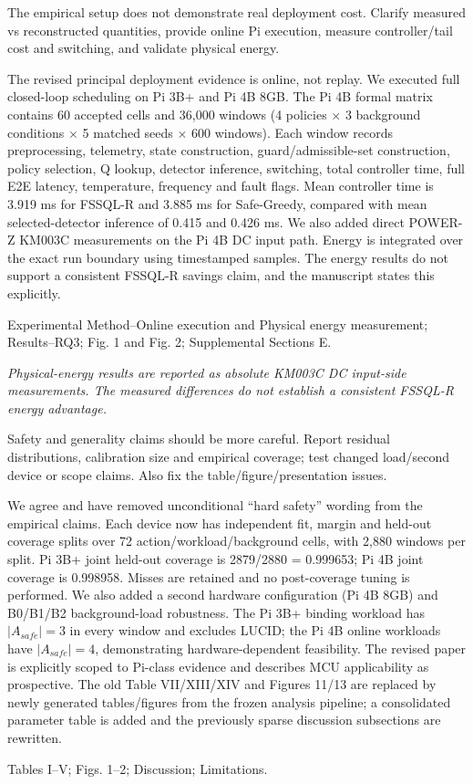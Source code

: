 \documentclass[11pt,a4paper]{article}
\newcommand{\commentbox}[1]{\begin{rcommentbox}#1\end{rcommentbox}}
\newcommand{\responsebox}[1]{\begin{authorresponsebox}#1\end{authorresponsebox}}
\newcommand{\changebox}[1]{\begin{wherebox}#1\end{wherebox}}
\begin{document}
\commentbox{The empirical setup does not demonstrate real deployment cost. Clarify measured vs reconstructed quantities, provide online Pi execution, measure controller/tail cost and switching, and validate physical energy.}
\responsebox{The revised principal deployment evidence is online, not replay. We executed full closed-loop scheduling on Pi 3B+ and Pi 4B 8GB. The Pi 4B formal matrix contains 60 accepted cells and 36,000 windows (4 policies $\times$ 3 background conditions $\times$ 5 matched seeds $\times$ 600 windows). Each window records preprocessing, telemetry, state construction, guard/admissible-set construction, policy selection, Q lookup, detector inference, switching, total controller time, full E2E latency, temperature, frequency and fault flags. Mean controller time is 3.919 ms for FSSQL-R and 3.885 ms for Safe-Greedy, compared with mean selected-detector inference of 0.415 and 0.426 ms. We also added direct POWER-Z KM003C measurements on the Pi 4B DC input path. Energy is integrated over the exact run boundary using timestamped samples. The energy results do not support a consistent FSSQL-R savings claim, and the manuscript states this explicitly.}
\changebox{Experimental Method--Online execution and Physical energy measurement; Results--RQ3; Fig. 1 and Fig. 2; Supplemental Sections E.}
\begin{excerptbox}
\emph{Physical-energy results are reported as absolute KM003C DC input-side measurements. The measured differences do not establish a consistent FSSQL-R energy advantage.}
\end{excerptbox}

\commentbox{Safety and generality claims should be more careful. Report residual distributions, calibration size and empirical coverage; test changed load/second device or scope claims. Also fix the table/figure/presentation issues.}
\responsebox{We agree and have removed unconditional ``hard safety'' wording from the empirical claims. Each device now has independent fit, margin and held-out coverage splits over 72 action/workload/background cells, with 2,880 windows per split. Pi 3B+ joint held-out coverage is 2879/2880 = 0.999653; Pi 4B joint coverage is 0.998958. Misses are retained and no post-coverage tuning is performed. We also added a second hardware configuration (Pi 4B 8GB) and B0/B1/B2 background-load robustness. The Pi 3B+ binding workload has $|A_{safe}|=3$ in every window and excludes LUCID; the Pi 4B online workloads have $|A_{safe}|=4$, demonstrating hardware-dependent feasibility. The revised paper is explicitly scoped to Pi-class evidence and describes MCU applicability as prospective. The old Table VII/XIII/XIV and Figures 11/13 are replaced by newly generated tables/figures from the frozen analysis pipeline; a consolidated parameter table is added and the previously sparse discussion subsections are rewritten.}
\changebox{Tables I--V; Figs. 1--2; Discussion; Limitations.}
\end{document}
